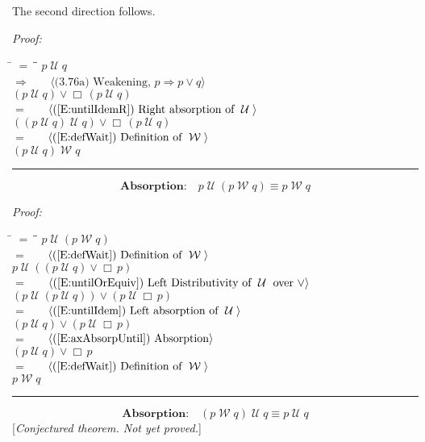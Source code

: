 \documentclass[fleqn, leqno]{article}
\newcommand{\lgap}{2pt}                             %
\newcommand{\mymathindent}{24pt}                    %
\newcommand{\impl}{\ensuremath{\Rightarrow}}        %
\newcommand{\Until}{\;\mathcal{U}\;}
\newcommand{\Wait}{\;\mathcal{W}\;}
\newcommand{\Always}{\Box\,}
\newcommand{\myqed}{\rule[-.23ex]{1.2ex}{2.0ex}}
\newcommand{\myqedtab}{\hspace{388.5pt}}              %
\newcommand{\Gll} {\langle}                         %
\newcommand{\Ggg} {\rangle}                         %
\newcommand{\Hint}[1]     {\ \ \ $\Gll              \mbox{#1} \Ggg$ }   %
\begin{document}
The second direction follows.

\emph{Proof:}
\begin{tabbing}
\hspace{\mymathindent} \= $= \;$ \= \myqedtab \= \kill
\> \> $p \Until q$\\[\lgap]
\> $\impl$ \> \Hint{(3.76a) Weakening, $p \impl p \lor q$} \\[\lgap]
\> \> $(p \Until q) \lor \Always (p \Until q)$\\[\lgap]
\> $=$ \> \Hint{(\ref{E:untilIdemR}) Right absorption of $\Until$} \\[\lgap]
\> \> $((p \Until q) \Until q) \lor \Always (p \Until q)$\\[\lgap]
\> $=$ \> \Hint{(\ref{E:defWait}) Definition of $\Wait$} \\[\lgap]
\> \> $(p \Until q) \Wait q$ \> \myqed
\end{tabbing}

\begin{equation}\label{E:leftUntilAbsWait}
\textbf{Absorption:}\quad p \Until (p \Wait q) \equiv p \Wait q
\end{equation}

\emph{Proof:}
\begin{tabbing}
\hspace{\mymathindent} \= $= \;$ \= \myqedtab \= \kill
\> \> $p \Until (p \Wait q)$\\[\lgap]
\> $=$ \> \Hint{(\ref{E:defWait}) Definition of $\Wait$} \\[\lgap]
\> \> $p \Until ((p \Until q) \lor \Always p)$\\[\lgap]
\> $=$ \> \Hint{(\ref{E:untilOrEquiv}) Left Distributivity of $\Until$ over $\lor$} \\[\lgap]
\> \> $(p \Until (p \Until q)) \lor (p \Until \Always p)$\\[\lgap]
\> $=$ \> \Hint{(\ref{E:untilIdem}) Left absorption of $\Until$} \\[\lgap]
\> \> $(p \Until q) \lor (p \Until \Always p)$\\[\lgap]
\> $=$ \> \Hint{(\ref{E:axAbsorpUntil}) Absorption} \\[\lgap]
\> \> $(p \Until q) \lor \Always p$\\[\lgap]
\> $=$ \> \Hint{(\ref{E:defWait}) Definition of $\Wait$} \\[\lgap]
\> \> $p \Wait q$ \> \myqed
\end{tabbing}

\begin{equation}\label{E:rightUntilAbsWait}
\textbf{Absorption:}\quad (p \Wait q) \Until q \equiv p \Until q
\end{equation}
[\textit{Conjectured theorem. Not yet proved.}]
\end{document}
